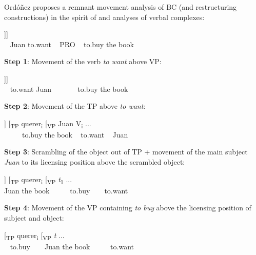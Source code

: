 \documentclass[output=paper]{langsci/langscibook}
\begin{document}
Ordóñez proposes a remnant movement analysis of BC (and restructuring constructions) in the spirit of  and  analyses of verbal complexes:

\ea%
    \label{ex:alexiadou:18}
    \begin{xlista}
    \setcounter{xnumii}{0}
    \ex \gll\relax [\textsubscript{VP} Juan querer [\textsubscript{CP} PRO [\textsubscript{VP} comprar el libro]]]\\
                    ~ Juan to.want ~ PRO ~ to.buy the book\\
    \end{xlista}
    \textsf{\bfseries Step 1}: Movement of the verb \textit{to want} above VP:
    \begin{xlista}
    \setcounter{xnumii}{1}
    \ex \gll\relax [\textsubscript{TP} querer\textsubscript{} Juan V\textsubscript{i} [\textsubscript{TP} PRO [\textsubscript{VP} comprar el libro]]]\\
      ~ to.want Juan ~ ~ ~ ~ to.buy the book\\
    \end{xlista}
    \textsf{\bfseries Step 2}: Movement of the TP above \textit{to want}:
    \begin{xlista}
    \setcounter{xnumii}{2}
    \ex \gll\relax [[\textsubscript{TP} PRO [\textsubscript{VP} comprar el libro]] [\textsubscript{TP} querer\textsubscript{i} [\textsubscript{VP} Juan V\textsubscript{i} ...\\
       ~ ~ ~ to.buy the book ~ to.want ~ Juan\\
    \end{xlista}
    \textsf{\bfseries Step 3}: Scrambling of the object out of TP + movement of the main subject \textit{Juan} to its licensing position above the scrambled object:
    \begin{xlista}
    \setcounter{xnumii}{3}
    \ex \gll\relax  [ Juan\textsubscript{1} el libro\textsubscript{2} [[\textsubscript{TP} PRO [\textsubscript{VP} comprar \textit{t}\textsubscript{2}]] [\textsubscript{TP} querer\textsubscript{i} [\textsubscript{VP} \textit{t}\textsubscript{1} ...\\
                    {} Juan the book ~ ~ ~ to.buy ~ ~ to.want\\
    \end{xlista}
    \textsf{\bfseries Step 4}: Movement of the VP containing \textit{to buy} above the licensing position of subject and object:
    \begin{xlista}
    \setcounter{xnumii}{4}
    \ex \gll\relax [[\textsubscript{VP} comprar \textit{t}\textsubscript{2}] [ Juan el libro [[\textsubscript{TP} PRO] [\textsubscript{TP} querer\textsubscript{i} [\textsubscript{VP} \textit{t} ...\\
                   ~ to.buy ~ ~ Juan the book ~ ~ ~ to.want\\
    \end{xlista}
\end{document}
